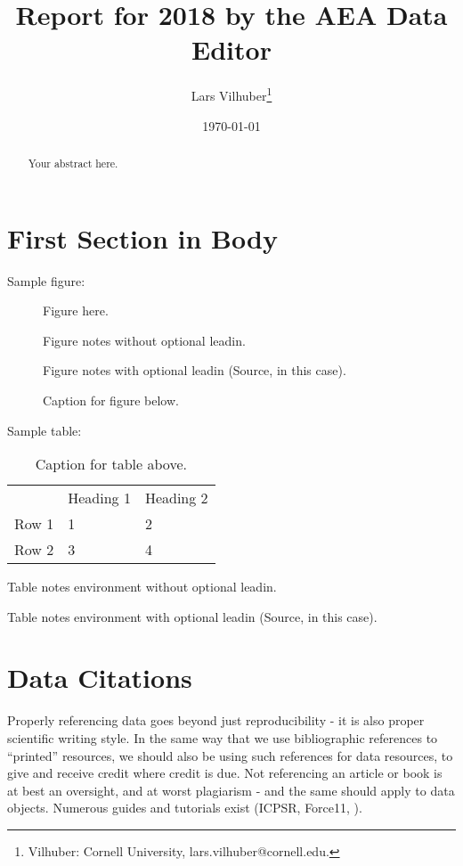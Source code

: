 \documentclass[AEJ]{AEA}
\begin{document}
\title{Report for 2018 by the AEA Data Editor }
\author{Lars Vilhuber\thanks{%
Vilhuber: Cornell University, lars.vilhuber@cornell.edu.}}
\date{\today}
\JEL{}
\Keywords{}

\begin{abstract}
Your abstract here.
\end{abstract}

\maketitle


\section{First Section in Body}

Sample figure:

\begin{figure}
Figure here.

\caption{Caption for figure below.}
\begin{figurenotes}
Figure notes without optional leadin.
\end{figurenotes}
\begin{figurenotes}[Source]
Figure notes with optional leadin (Source, in this case).
\end{figurenotes}
\end{figure}

Sample table:

\begin{table}
\caption{Caption for table above.}

\begin{tabular}{lll}
& Heading 1 & Heading 2 \\ 
Row 1 & 1 & 2 \\ 
Row 2 & 3 & 4%
\end{tabular}
\begin{tablenotes}
Table notes environment without optional leadin.
\end{tablenotes}
\begin{tablenotes}[Source]
Table notes environment with optional leadin (Source, in this case).
\end{tablenotes}
\end{table}

\section{Data Citations}
Properly referencing data goes beyond just reproducibility - it is also proper scientific writing style. In the same way that we use bibliographic references to ``printed'' resources, we should also be using such references for data resources, to give and receive credit where credit is due. Not referencing an article or book is at best an oversight, and at worst plagiarism - and the same should apply to data objects. Numerous guides and tutorials exist (ICPSR, Force11, \cite{dataone-l09}).
\end{document}
